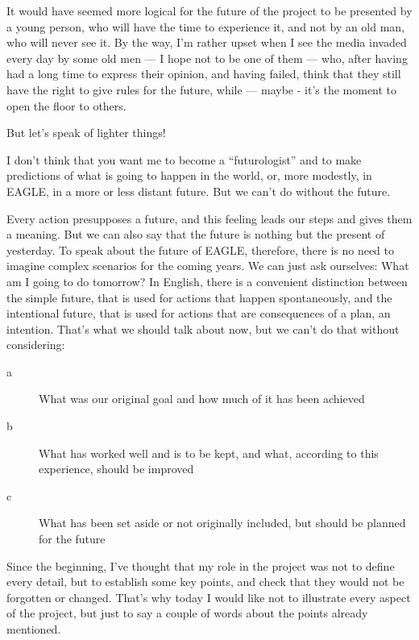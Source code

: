 It would have seemed more logical for the future of the project to be presented by a young person, who will have the time to experience it, and not by an old man, who will never see it. By the way, I’m rather upset when I see the media invaded every day by some old men --- I hope not to be one of them --- who, after having had a long time to express their opinion, and having failed, think that they still have the right to give rules for the future, while --- maybe - it’s the moment to open the floor to others.

But let’s speak of lighter things!

I don’t think that you want me to become a ``futurologist'' and to make predictions of what is going to happen in the world, or, more modestly, in EAGLE, in a more or less distant future. But we can’t do without the future.

Every action presupposes a future, and this feeling leads our steps and gives them a meaning. But we can also say that the future is nothing but the present of yesterday. To speak about the future of EAGLE, therefore, there is no need to imagine complex scenarios for the coming years. We can just ask ourselves: What am I going to do tomorrow? In English, there is a convenient distinction between the simple future, that is used for actions that happen spontaneously, and the intentional future, that is used for actions that are consequences of a plan, an intention. That’s what we should talk about now, but we can’t do that without considering:
\begin{description}
\item[a] What was our original goal and how much of it has been achieved
\item[b] What has worked well and is to be kept, and what, according to this experience, should be improved
\item[c] What has been set aside or not originally included, but should be planned for the future
\end{description}

Since the beginning, I’ve thought that my role in the project was not to define every detail, but to establish some key points, and check that they would not be forgotten or changed. That’s why today I would like not to illustrate every aspect of the project, but just to say a couple of words about the points already mentioned.


